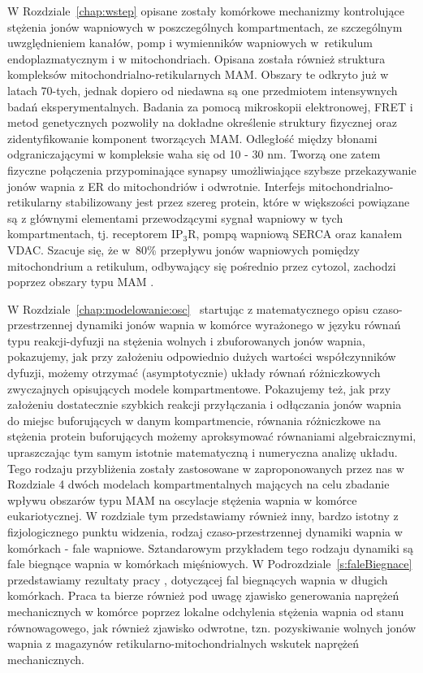 \medskip 

W Rozdziale~\ref{chap:wstep} opisane zostały komórkowe mechanizmy kontrolujące stężenia jonów wapniowych w poszczególnych kompartmentach, ze szczególnym uwzględnieniem kanałów, pomp i wymienników wapniowych w~retikulum endoplazmatycznym i w mitochondriach. Opisana została również struktura kompleksów mitochondrialno-retikularnych MAM. Obszary te odkryto już w latach 70-tych, jednak dopiero od niedawna są one przedmiotem intensywnych badań eksperymentalnych. Badania za pomocą mikroskopii elektronowej, FRET i metod genetycznych pozwoliły na dokładne określenie struktury fizycznej oraz zidentyfikowanie komponent tworzących MAM. Odległość między błonami odgraniczającymi w kompleksie waha się od 10 - 30 nm. Tworzą one zatem fizyczne połączenia przypominające synapsy umożliwiające szybsze przekazywanie jonów wapnia z ER do mitochondriów i odwrotnie. Interfejs mitochondrialno-retikularny stabilizowany jest przez szereg protein, które w większości powiązane są z głównymi elementami przewodzącymi sygnał wapniowy w tych kompartmentach, tj. receptorem IP$_3$R, pompą wapniową SERCA oraz kanałem VDAC. Szacuje się, że w~80\% przepływu jonów wapniowych pomiędzy mitochondrium a retikulum, odbywający się pośrednio przez cytozol, zachodzi poprzez obszary typu MAM \cite{Csordas1999,Mannella1998}. 

\medskip 

W Rozdziale~\ref{chap:modelowanie:osc}~ startując z matematycznego opisu czaso-przestrzennej dynamiki jonów wapnia w komórce wyrażonego w języku równań typu reakcji-dyfuzji na stężenia wolnych i zbuforowanych jonów wapnia, pokazujemy, jak przy założeniu odpowiednio dużych wartości współczynników dyfuzji, możemy otrzymać (asymptotycznie) układy równań różniczkowych zwyczajnych opisujących modele kompartmentowe. Pokazujemy też, jak przy założeniu dostatecznie szybkich reakcji przyłączania i odłączania jonów wapnia do miejsc buforujących w danym kompartmencie, równania różniczkowe na stężenia protein buforujących możemy aproksymować równaniami algebraicznymi, upraszczając tym samym istotnie matematyczną i numeryczna analizę układu. Tego rodzaju przybliżenia zostały zastosowane w zaproponowanych przez nas w Rozdziale 4 dwóch modelach kompartmentalnych mających na celu zbadanie wpływu obszarów typu MAM na oscylacje stężenia wapnia w komórce eukariotycznej. W rozdziale tym przedstawiamy również inny, bardzo istotny z fizjologicznego punktu widzenia, rodzaj czaso-przestrzennej dynamiki wapnia w komórkach - fale wapniowe. Sztandarowym przykładem tego rodzaju dynamiki są fale biegnące  wapnia w komórkach mięśniowych. W Podrozdziale~\ref{s:faleBiegnace} przedstawiamy rezultaty pracy \cite{Kazmierczak2013,Kazmierczak2010,Kazmierczak2011}, dotyczącej fal biegnących wapnia w długich komórkach. Praca ta bierze również pod uwagę zjawisko generowania naprężeń mechanicznych w komórce poprzez lokalne odchylenia stężenia wapnia od stanu równowagowego, jak również zjawisko odwrotne, tzn. pozyskiwanie wolnych jonów wapnia z magazynów retikularno-mitochondrialnych wskutek naprężeń mechanicznych. 


